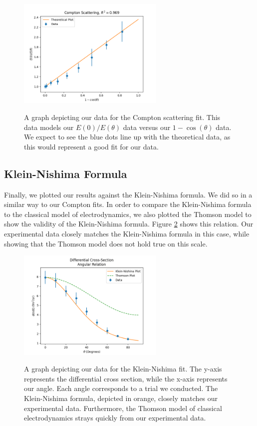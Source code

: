 \documentclass[10pt,letterpaper,onecolumn]{article}
\begin{document}
\begin{figure}[hbt!]
    \begin{center}
        {{\includegraphics[width=7cm]{R2Compton.png} }}%
        \caption{A graph depicting our data for the Compton scattering fit. This data models our $E(0)/E(\theta)$ data versus our $1 - \cos(\theta)$ data. We expect to see the blue dots line up with the theoretical data, as this would represent a good fit for our data.}%
        \label{fig:r2}%
    \end{center}
\end{figure}

\subsection{Klein-Nishima Formula}
Finally, we plotted our results against the Klein-Nishima formula. We did so in a similar way to our Compton fits. In order to compare the Klein-Nishima formula to the classical model of electrodynamics, we also plotted the Thomson model to show the validity of the Klein-Nishima formula. Figure \ref{fig:kn} shows this relation. Our experimental data closely matches the Klein-Nishima formula in this case, while showing that the Thomson model does not hold true on this scale.
\begin{figure}[hbt!]
    \begin{center}
        {{\includegraphics[width=7cm]{KNvsT.png} }}%
        \caption{A graph depicting our data for the Klein-Nishima fit. The y-axis represents the differential cross section, while the x-axis represents our angle. Each angle corresponds to a trial we conducted. The Klein-Nishima formula, depicted in orange, closely matches our experimental data. Furthermore, the Thomson model of classical electrodynamics strays quickly from our experimental data.}%
        \label{fig:kn}%
    \end{center}
\end{figure}
\end{document}
